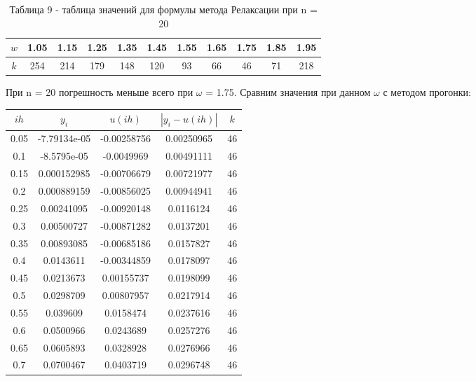 \documentclass[a4paper,12pt]{article}
\begin{document}
\begin{enumerate}[label = \arabic*.]
{\begin{table}[h]
      \centering
      \begin{tabular}{|c|c|c|c|c|c|c|c|c|c|c|}
        \hline
        $w$ & 1.05 & 1.15 & 1.25 & 1.35 & 1.45 & 1.55 & 1.65 & 1.75 & 1.85 & 1.95 \\ \hline
        $k$ & 254 & 214 & 179 & 148 & 120 & 93 & 66 & 46 & 71 & 218 \\ \hline
      \end{tabular}
      \caption*{\small{Таблица 9 - таблица значений для формулы метода Релаксации при n = 20}}
    \end{table}
  \newpage
  \hspace{0.5cm} При n = 20 погрешность меньше всего при $\omega$ = 1.75. 
  Сравним значения при данном $\omega$ с методом прогонки:
      \begin{table}[h]
        \centering
        \begin{tabular}{|c|c|c|c|c|}
          \hline
          $ih$ & $y_i$ & $u(ih)$ & $\left|y_i-u(ih)\right|$ & $k$ \\ \hline
          0.05 & -7.79134e-05 &  -0.00258756 &   0.00250965 & 46\\ \hline
          0.1 &  -8.5795e-05 &   -0.0049969 &   0.00491111 & 46\\ \hline
          0.15 &  0.000152985 &  -0.00706679 &   0.00721977 & 46\\ \hline
          0.2 &  0.000889159 &  -0.00856025 &   0.00944941 & 46\\ \hline
          0.25 &   0.00241095 &  -0.00920148 &    0.0116124 & 46\\ \hline
          0.3 &   0.00500727 &  -0.00871282 &    0.0137201 & 46\\ \hline
          0.35 &   0.00893085 &  -0.00685186 &    0.0157827 & 46\\ \hline
          0.4 &    0.0143611 &  -0.00344859 &    0.0178097 & 46\\ \hline
          0.45 &    0.0213673 &   0.00155737 &    0.0198099 & 46\\ \hline
          0.5 &    0.0298709 &   0.00807957 &    0.0217914 & 46\\ \hline
          0.55 &     0.039609 &    0.0158474 &    0.0237616 & 46\\ \hline
          0.6 &    0.0500966 &    0.0243689 &    0.0257276 & 46\\ \hline
          0.65 &    0.0605893 &    0.0328928 &    0.0276966 & 46\\ \hline
          0.7 &    0.0700467 &    0.0403719 &    0.0296748 & 46\\ \hline

\end{tabular}
\end{table}}
\end{enumerate}
\end{document}
